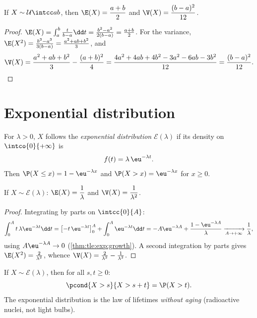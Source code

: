 \begin{proposition}\label{prop:tle:contdist:uniformmoments}
If $X \sim \mathcal U\intcc ab$, then
$\E(X) = \dfrac{a+b}{2}$ and $\V(X) = \dfrac{(b-a)^2}{12}$.
\end{proposition}

\begin{proof}
$\E(X) = \int_a^b \frac{t}{b-a}\dd t
= \frac{b^2 - a^2}{2(b-a)} = \frac{a+b}{2}$. For the variance,
$\E(X^2) = \frac{b^3 - a^3}{3(b-a)} = \frac{a^2 + ab + b^2}{3}$, and
\[
\V(X) = \frac{a^2 + ab + b^2}{3} - \frac{(a+b)^2}{4}
= \frac{4a^2 + 4ab + 4b^2 - 3a^2 - 6ab - 3b^2}{12}
= \frac{(b - a)^2}{12}. \qedhere
\]
\end{proof}

\section{Exponential distribution}

\begin{definition}\label{def:tle:contdist:expo}
For $\lambda > 0$, $X$ follows the \emph{exponential
distribution} $\mathcal E(\lambda)$ if its
density on $\intco{0}{+\infty}$ is
\[
f(t) = \lambda\,\eu^{-\lambda t}.
\]
Then $\P(X \leq x) = 1 - \eu^{-\lambda x}$ and
$\P(X > x) = \eu^{-\lambda x}$ for $x \geq 0$.
\end{definition}

\begin{proposition}\label{prop:tle:contdist:expomoments}
If $X \sim \mathcal E(\lambda)$:
$\E(X) = \dfrac{1}{\lambda}$ and $\V(X) = \dfrac{1}{\lambda^2}$.
\end{proposition}

\begin{proof}
Integrating by parts on $\intcc{0}{A}$:
\[
\int_0^A t\,\lambda\eu^{-\lambda t}\dd t
= \bigl[-t\,\eu^{-\lambda t}\bigr]_0^A + \int_0^A \eu^{-\lambda t}\dd t
= -A\eu^{-\lambda A} + \frac{1 - \eu^{-\lambda A}}{\lambda}
\xrightarrow[A\to+\infty]{} \frac1\lambda,
\]
using $A\eu^{-\lambda A} \to 0$ (\cref{thm:tle:exp:growth}). A second
integration by parts gives $\E(X^2) = \frac{2}{\lambda^2}$, whence
$\V(X) = \frac{2}{\lambda^2} - \frac{1}{\lambda^2}$.
\end{proof}

\begin{theorem}[Memorylessness]\label{thm:tle:contdist:memoryless}
If $X \sim \mathcal E(\lambda)$, then for all $s, t \geq 0$:
\[
\pcond{X > s}{X > s + t} = \P(X > t) .
\]
The exponential distribution is the law of lifetimes \emph{without aging}
(radioactive nuclei, not light bulbs).
\end{theorem}


